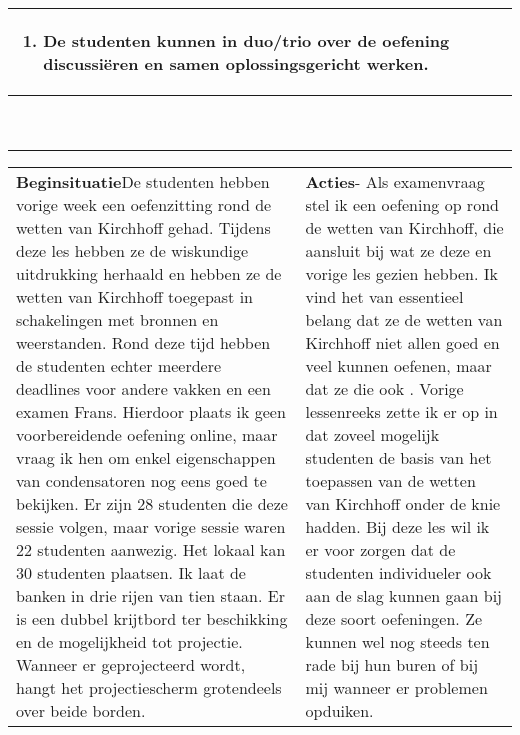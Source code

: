 \begin{landscape}
\begin{tabularx}{1.56\textwidth}{|p{}|X|}
\begin{enumerate}[itemsep=0.08\baselineskip]
			\item De studenten kunnen in duo/trio over de oefening discussiëren en samen oplossingsgericht werken.
		\end{enumerate} \\\hline
		\multicolumn{2}{c}{ }\\
		\multicolumn{2}{c}{ }\\
		\multicolumn{2}{c}{ }\\
		\multicolumn{2}{c}{ }\\
		\multicolumn{2}{c}{ }\\
		\multicolumn{2}{c}{ }\\
		\multicolumn{2}{c}{ }\\
		\multicolumn{2}{c}{ }\\
		\multicolumn{2}{c}{ }\\
	\end{tabularx}
	
	
	\begin{tabularx}{1.56\textwidth}{|p{}|X|}
		\hline
		\multirow{2}{0.55\textwidth}{\textbf{Beginsituatie}\newline De studenten hebben vorige week een oefenzitting rond de wetten van Kirchhoff gehad. Tijdens deze les hebben ze de wiskundige uitdrukking herhaald en hebben ze de wetten van Kirchhoff toegepast in schakelingen met bronnen en weerstanden. Rond deze tijd hebben de studenten echter meerdere deadlines voor andere vakken en een examen Frans. Hierdoor plaats ik geen voorbereidende oefening online, maar vraag ik hen om enkel eigenschappen van condensatoren nog eens goed te bekijken. \newline\newline Er zijn 28 studenten die deze sessie volgen, maar vorige sessie waren 22 studenten aanwezig. \newline\newline Het lokaal kan 30 studenten plaatsen. Ik laat de banken in drie rijen van tien staan. Er is een dubbel krijtbord ter beschikking en de mogelijkheid tot projectie. Wanneer er geprojecteerd wordt, hangt het projectiescherm grotendeels over beide borden.  }& \textbf{Acties}\newline  -  Als examenvraag stel ik een oefening op rond de wetten van Kirchhoff, die aansluit bij wat ze deze en vorige les gezien hebben. Ik vind het van essentieel belang dat ze de wetten van Kirchhoff niet allen goed en veel kunnen oefenen, maar dat ze die ook \GreenHighlight{conceptueel begrijpen}{4.5cm}. Vorige lessenreeks zette ik er op in dat zoveel mogelijk studenten de basis van het toepassen van de wetten van Kirchhoff onder de knie hadden. Bij deze les wil ik er voor zorgen dat de studenten individueler ook aan de slag kunnen gaan bij deze soort oefeningen. Ze kunnen wel nog steeds ten rade bij hun buren of bij mij wanneer er problemen opduiken. \newline\newline
		

\end{tabularx}
\end{landscape}

